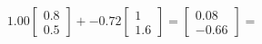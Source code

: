 \documentclass[preview]{standalone}
\begin{document}
\begin{align*}
1.00 \begin{bmatrix} 0.8 \\ 0.5 \end{bmatrix} + -0.72 \begin{bmatrix} 1 \\ 1.6 \end{bmatrix} = \begin{bmatrix} 0.08 \\ -0.66 \end{bmatrix} =
\end{align*}
\end{document}
